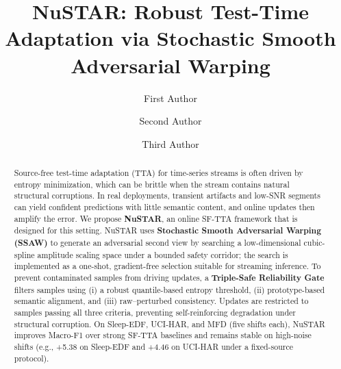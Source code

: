 \documentclass[sigconf, screen, review, anonymous]{acmart}
\theoremstyle{plain}
\theoremstyle{definition}
\theoremstyle{remark}
\begin{document}
\title[NuSTAR: Robust Test-Time Adaptation via Stochastic Smooth Adversarial Warping]{NuSTAR: Robust Test-Time Adaptation via Stochastic Smooth Adversarial Warping}

\author{First Author}

\author{Second Author}
\authornotemark[1]

\author{Third Author}

\renewcommand{\shortauthors}{First Author et al.}

\begin{abstract}
	Source-free test-time adaptation (TTA) for time-series streams is often driven by entropy minimization, which can be brittle when the stream contains natural structural corruptions. In real deployments, transient artifacts and low-SNR segments can yield confident predictions with little semantic content, and online updates then amplify the error. We propose \textbf{NuSTAR}, an online SF-TTA framework that is designed for this setting. NuSTAR uses \textbf{Stochastic Smooth Adversarial Warping (SSAW)} to generate an adversarial second view by searching a low-dimensional cubic-spline amplitude scaling space under a bounded safety corridor; the search is implemented as a one-shot, gradient-free selection suitable for streaming inference. To prevent contaminated samples from driving updates, a \textbf{Triple-Safe Reliability Gate} filters samples using (i) a robust quantile-based entropy threshold, (ii) prototype-based semantic alignment, and (iii) raw--perturbed consistency. Updates are restricted to samples passing all three criteria, preventing self-reinforcing degradation under structural corruption. On Sleep-EDF, UCI-HAR, and MFD (five shifts each), NuSTAR improves Macro-F1 over strong SF-TTA baselines and remains stable on high-noise shifts (e.g., +5.38 on Sleep-EDF and +4.46 on UCI-HAR under a fixed-source protocol).
\end{abstract}
\end{document}
